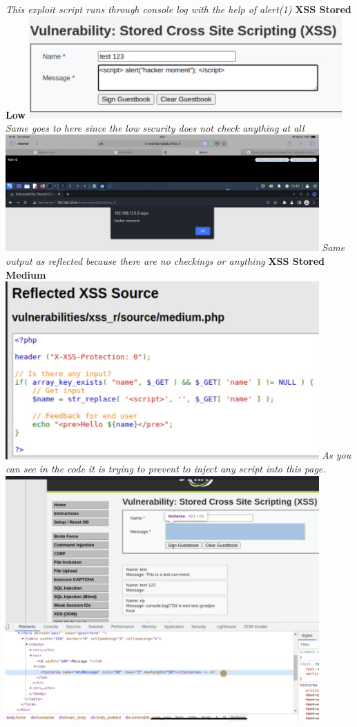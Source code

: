 \documentclass[12pt, letterpaper]{article}
\begin{document}
\break
\emph{This exploit script runs through console log with the help of alert(1)}
\hfill\break
\hfill\break
\textbf{XSS Stored Low}
\hfill\break
\hfill\break
\includegraphics[width=0.9\textwidth]{fotos/Week 4/Xss/Stored/Stored input.jpeg}
\break
\emph{Same goes to here since the low security does not check anything at all}
\hfill\break
\hfill\break
\includegraphics[width=0.9\textwidth]{fotos/Week 4/Xss/Stored/Stored output.jpeg}
\break
\emph{Same output as reflected because there are no checkings or anything}
\hfill\break
\hfill\break
\textbf{XSS Stored Medium}
\hfill\break
\hfill\break
\includegraphics[width=0.9\textwidth]{fotos/Week 4/Xss/Reflected/Medium/Source code.jpeg}
\break
\emph{As you can see in the code it is trying to prevent to inject any script into this page.}
\hfill\break
\hfill\break
\includegraphics[width=0.9\textwidth]{fotos/Week 4/Xss/Stored/Medium/Max lenght.jpeg}
\end{document}
